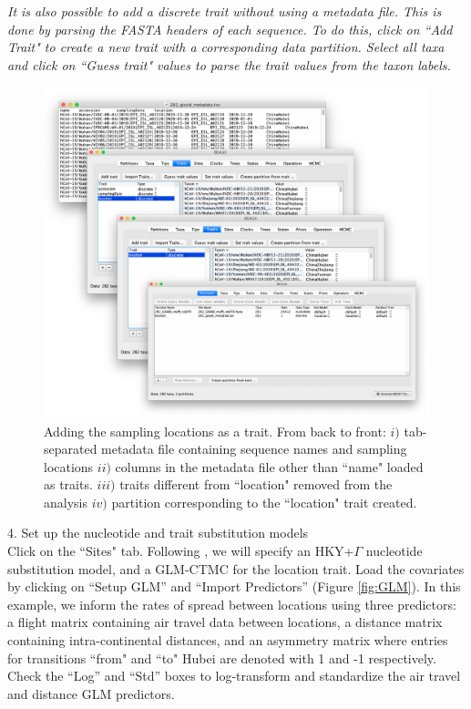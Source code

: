 \documentclass{article}
\newcommand{\ann}[1]{
\begin{adjustwidth}{0.5cm}{}
\it{#1}\\
\end{adjustwidth}}
\begin{document}
\ann{It is also possible to add a discrete trait without using a metadata file. This is done by parsing the FASTA headers of each sequence. To do this, click on ``Add Trait" to create a new trait with a corresponding data partition. Select all taxa and click on ``Guess trait" values to parse the trait values from the taxon labels.}

\begin{figure}[!ht]
    \centering
    \includegraphics[width=1\textwidth]{figs/location_trait.pdf}
    \caption{Adding the sampling locations as a trait. From back to front: $i)$ tab-separated metadata file containing sequence names and sampling locations $ii)$ columns in the metadata file other than ``name" loaded as traits. $iii)$ traits different from ``location" removed from the analysis $iv)$ partition corresponding to the ``location" trait created.}
    \label{fig:location}
\end{figure}

\clearpage

4. Set up the nucleotide and trait substitution models\\

Click on the ``Sites" tab. Following \cite{travhist}, we will specify an HKY+$\Gamma$ nucleotide substitution model, and a GLM-CTMC for the location trait.
Load the covariates by clicking on ``Setup GLM'' and ``Import Predictors'' (Figure \ref{fig:GLM}). In this example, we inform the rates of spread between locations using three predictors: a flight matrix containing air travel data between locations, a distance matrix containing intra-continental distances, and an asymmetry matrix where entries for transitions ``from" and ``to" Hubei are denoted with 1 and -1 respectively.
Check the ``Log'' and ``Std'' boxes to log-transform and standardize the air travel and distance GLM predictors.\\
\end{document}

